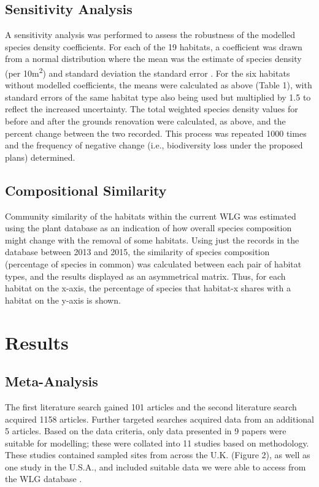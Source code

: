 \subsection{Sensitivity Analysis}
A sensitivity analysis was performed to assess the robustness of the modelled species density coefficients. For each of the 19 habitats, a coefficient was drawn from a normal distribution where the mean was the estimate of species density (per 10m\textsuperscript{2}) and standard deviation the standard error \citep{Newbold:2015nat}. For the six habitats without modelled coefficients, the means were calculated as above (Table 1), with standard errors of the same habitat type also being used but multiplied by 1.5 to reflect the increased uncertainty. The total weighted species density values for before and after the grounds renovation were calculated, as above, and the percent change between the two recorded.  This process was repeated 1000 times and the frequency of negative change (i.e., biodiversity loss under the proposed plans) determined.

\subsection{Compositional Similarity}
Community similarity of the habitats within the current WLG was estimated using the plant database as an indication of how overall species composition might change with the removal of some habitats.  Using just the records in the database between 2013 and 2015, the similarity of species composition (percentage of species in common) was calculated between each pair of habitat types, and the results displayed as an asymmetrical matrix. Thus, for each habitat on the x-axis, the percentage of species that habitat-x shares with a habitat on the y-axis is shown.

\section{Results}
\subsection{Meta-Analysis}
The first literature search gained 101 articles and the second literature search acquired 1158 articles.  Further targeted searches acquired data from an additional 5 articles. Based on the data criteria, only data presented in 9 papers were suitable for modelling; these were collated into 11 studies based on methodology.  These studies contained sampled sites from across the U.K. (Figure 2), as well as one study in the U.S.A., and included suitable data we were able to access from the WLG database .

